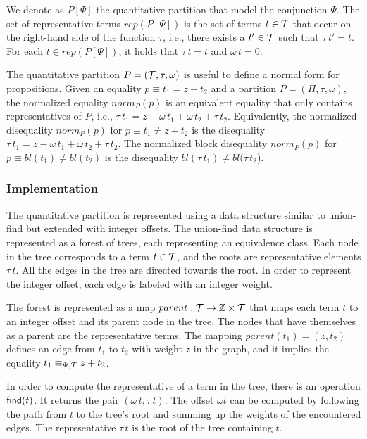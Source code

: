 We denote as $P[\Psi]$ the quantitative partition that model the conjunction $\Psi$.
The set of representative terms $rep(P[\Psi])$ is the set of terms $t \in \mathcal{T}$ that occur on the right-hand side of the function $\tau$, i.e., there exists a $t'\in \mathcal{T}$ such that $\tau\,t' = t$.
For each $t\in rep(P[\Psi])$, it holds that $\tau\,t=t$ and $\omega\,t = 0$.

The quantitative partition $P = (\mathcal{T}, \tau, \omega)$ is useful to define a normal form for propositions.
Given an equality $p \equiv t_1 = z + t_2$ and a partition $P = (\Pi, \tau, \omega)$,
the normalized equality $norm_P(p)$ is an equivalent equality that only contains representatives of $P$,
i.e., $\tau\,t_1 = z - \omega\,t_1 + \omega\,t_2 + \tau\,t_2$.
Equivalently, the normalized disequality $norm_P(p)$ for $p \equiv t_1 \neq z + t_2$ is the disequality $\tau\,t_1 = z - \omega\,t_1 + \omega\,t_2 + \tau\,t_2$.
The normalized block disequality $norm_P(p)$ for $p \equiv bl(t_1) \neq bl(t_2)$ is the disequality $bl(\tau\,t_1) \neq bl(\tau\,t_2$).

\subsubsection{Implementation}

The quantitative partition is represented using a data structure similar to union-find but extended with integer offsets.
The union-find data structure is represented as a forest of trees, each representing an equivalence class.
Each node in the tree corresponds to a term $t \in \mathcal{T}$, and the roots are representative elements $\tau\,t$.\cite{uf-tarjan}
All the edges in the tree are directed towards the root.
In order to represent the integer offset, each edge is labeled with an integer weight.

The forest is represented as a map $parent : \mathcal{T} \rightarrow \mathbb{Z} \times \mathcal{T}$ that maps each term $t$ to an integer offset and its parent node in the tree.
The nodes that have themselves as a parent are the representative terms.
The mapping $parent(t_1) = (z,t_2)$ defines an edge from $t_1$ to $t_2$ with weight $z$ in the graph, and it implies the equality $t_1 \equiv_{\Psi,\mathcal{T}} z + t_2$.

In order to compute the representative of a term in the tree, there is an operation $\textsf{find}(t)$.
It returns the pair $(\omega\,t,\tau\,t)$.
The offset $\omega t$ can be computed by following the path from $t$ to the tree's root and summing up the weights of the encountered edges.
The representative $\tau\,t$ is the root of the tree containing $t$.

